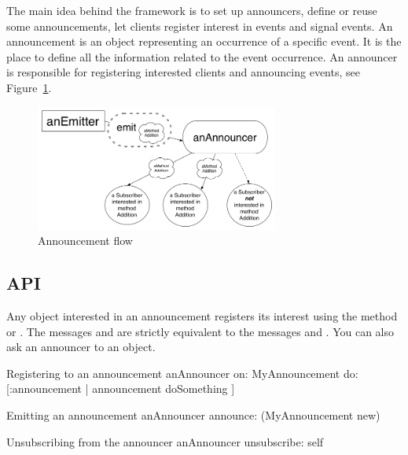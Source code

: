 \documentclass[a4paper,10pt,twoside]{book}
\begin{document}
The main idea behind the framework is to set up announcers, define or
reuse some announcements, let clients register interest in events and
signal events. An announcement is an object representing an occurrence of a
specific event. It is the place to define all the information related
to the event occurrence. An announcer is responsible for registering
interested clients and announcing events, see Figure~\ref{fig:announcementFlow}.

\begin{figure}[ht]\centering
	\includegraphics[width=8cm]{AnnouncementFlow2}
	\caption{Announcement flow}
	\label{fig:announcementFlow}
\end{figure} 

\subsection{API}

Any object interested in an announcement registers its interest
using the method 
or .  The messages
 and  are strictly equivalent to the
messages   and . You can also ask an announcer to
 an object.


\begin{code}{Registering to an announcement}
	anAnnouncer on: MyAnnouncement do: [:announcement | announcement doSomething ]
\end{code}


\begin{code}{Emitting an announcement}
	anAnnouncer announce: (MyAnnouncement new)
\end{code}

\begin{method}{Unsubscribing from the announcer}
    anAnnouncer unsubscribe: self
\end{method}
\end{document}
